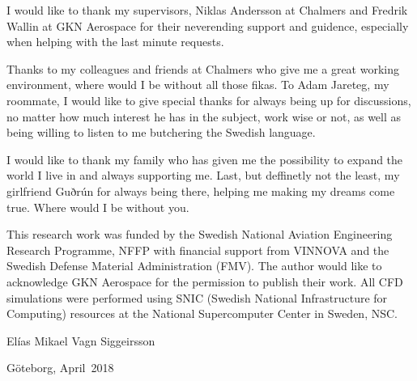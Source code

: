 I would like to thank my supervisors, Niklas Andersson at Chalmers and Fredrik Wallin at GKN Aerospace for their neverending support and guidence, especially when helping with the last minute requests.

Thanks to my colleagues and friends at Chalmers who give me a great working environment, where would I be without all those fikas. To Adam Jareteg, my roommate, I would like to give special thanks for always being up for discussions, no matter how much interest he has in the subject, work wise or not, as well as being willing to listen to me butchering the Swedish language.

I would like to thank my family who has given me the possibility to expand the world I live in and always supporting me. Last, but deffinetly not the least, my girlfriend Guðrún for always being there, helping me making my dreams come true. Where would I be without you.

\vskip 2pc

This research work was funded by the Swedish National Aviation Engineering Research Programme, NFFP
with financial support from VINNOVA and the Swedish Defense Material Administration (FMV). The author would like to acknowledge GKN Aerospace for the permission to publish their work. All CFD simulations were performed using SNIC (Swedish National Infrastructure for Computing) resources at the National Supercomputer Center in Sweden, NSC.
\vskip 2pc

\noindent Elías Mikael Vagn Siggeirsson

\noindent Göteborg, April\ 2018
